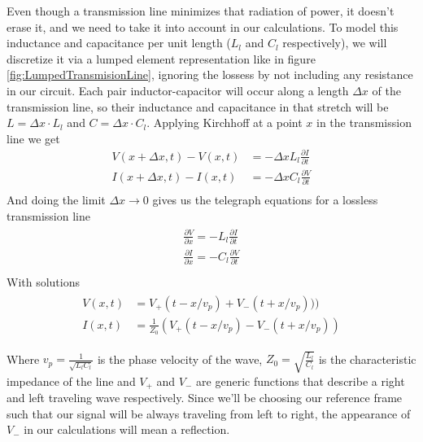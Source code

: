 \documentclass[../main.tex]{subfiles}
\begin{document}
Even though a transmission line minimizes that radiation of power, it doesn't
erase it, and we need to take it into account in our calculations. To model this
inductance and capacitance per unit length (\(L_{l}\) and \(C_{l}\) respectively),
we will discretize it via a lumped element representation like in figure
\ref{fig:LumpedTransmisionLine}, ignoring the lossess by not including any
resistance  in our circuit.
Each pair inductor-capacitor will occur along a length \(\Delta x\) of the
transmission line, so their inductance and capacitance in that stretch will be
\(L = \Delta x \cdot L_{l}\) and \(C = \Delta x \cdot C_{l}\). Applying Kirchhoff
at a point \(x\) in the transmission line we get
\begin{align*}
    V(x+\Delta x, t) - V(x, t) &= -\Delta x L_{l} \frac{\partial I}{\partial t}\\
    I(x+\Delta x, t) - I(x, t) &= -\Delta x C_{l} \frac{\partial V}{\partial t}\\
\end{align*}
And doing the limit \(\Delta x \to 0\) gives us the telegraph equations for a
lossless transmission line
\begin{align}
\begin{split}
\label{eq:TelegraphEq}
    \frac{\partial V}{\partial x} = - L_{l}\frac{\partial I}{\partial t}\\
    \frac{\partial I}{\partial x} = - C_{l}\frac{\partial V}{\partial t}\\
\end{split}
\end{align}
With solutions
\begin{align*}
\begin{split}
    \label{eq:TelegraphSol}
    V(x,t) &= V_{+}(t - x/v_{p}) + V_{-}(t + x/v_{p})))\\
    I(x,t) &= \frac{1}{Z_{0}}(V_{+}(t - x/v_{p}) - V_{-}(t + x/v_{p}))
\end{split}
\end{align*}

Where \(v_{p} = \frac{1}{\sqrt{L_{l}C_{l}}}\) is the phase velocity of the wave,
\(Z_{0} = \sqrt{\frac{L_{l}}{C_{l}}}\) is the characteristic impedance of the
line and \(V_{+}\) and \(V_{-}\) are generic functions that describe a right
and left traveling wave respectively. Since we'll be choosing our reference
frame such that our signal will be always traveling from left to right, the
appearance of \(V_{-}\) in our calculations will mean a reflection.
\end{document}
